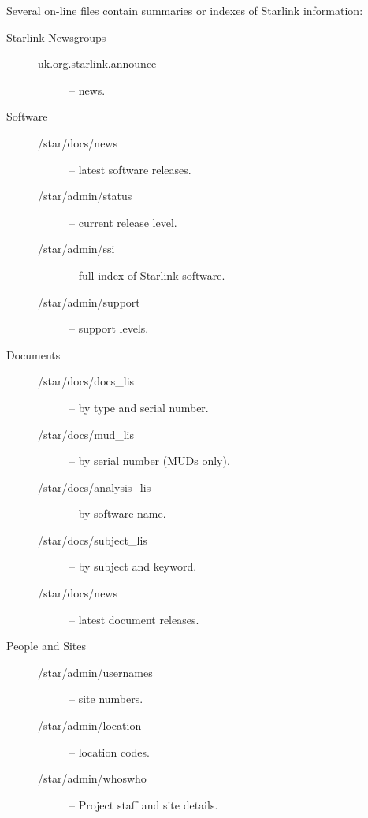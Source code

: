 Several on-line files contain summaries or indexes of Starlink information:

\newpage

\begin{description}

\item [Starlink Newsgroups] \hspace*{\fill}

\begin{description}
\item [uk.org.starlink.announce] -- news.
\end{description}

\item [Software] \hspace*{\fill}

\begin{description}
\item [/star/docs/news] -- latest software releases.
\item [/star/admin/status] -- current release level.
\item [/star/admin/ssi] -- full index of Starlink software.
\item [/star/admin/support] -- support levels.
\end{description}

\item [Documents] \hspace*{\fill}

\begin{description}
\item [/star/docs/docs\_lis] --  by type and serial number.
\item [/star/docs/mud\_lis] -- by serial number (MUDs only).
\item [/star/docs/analysis\_lis] -- by software name.
\item [/star/docs/subject\_lis] --  by subject and keyword.
\item [/star/docs/news] -- latest document releases.
\end{description}

\item [People and Sites] \hspace*{\fill}

\begin{description}
\item [/star/admin/usernames] -- site numbers.
\item [/star/admin/location] -- location codes.
\item [/star/admin/whoswho] -- Project staff and site details.
\end{description}

\end{description}

